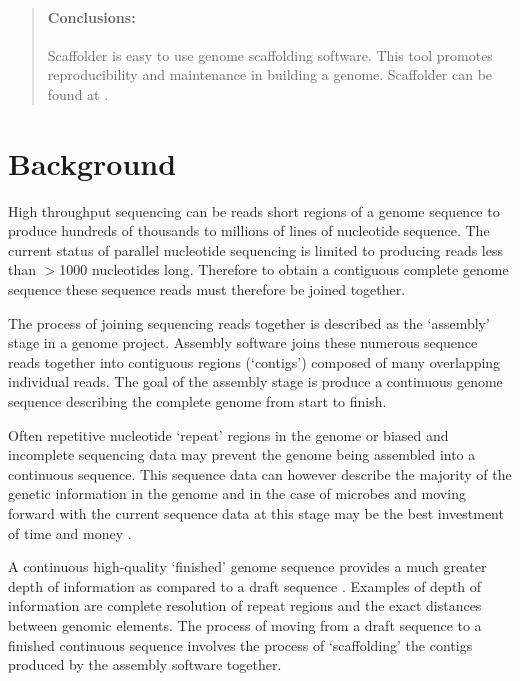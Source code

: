 \documentclass[10pt]{bmc_article}
\newenvironment{bmcformat}{\begin{raggedright}\baselineskip20pt\sloppy\setboolean{publ}{false}}{\end{raggedright}\baselineskip20pt\sloppy}
\begin{document}
\begin{bmcformat}
\begin{abstract}
  \paragraph*{Conclusions:} Scaffolder is easy to use genome scaffolding
  software. This tool promotes reproducibility and maintenance in building
  a genome. Scaffolder can be found at \scaffolder.

\end{abstract}


\section*{Background} %

High throughput sequencing can be reads short regions of a genome sequence to
produce hundreds of thousands to millions of lines of nucleotide sequence. The
current status of parallel nucleotide sequencing is limited to producing reads
less than $>$1000 nucleotides long. Therefore to obtain a contiguous complete
genome sequence these sequence reads must therefore be joined together. \pb

The process of joining sequencing reads together is described as the
`assembly' stage in a genome project. Assembly software joins these numerous
sequence reads together into contiguous regions (`contigs') composed of many
overlapping individual reads. The goal of the assembly stage is produce
a continuous genome sequence describing the complete genome from start to
finish. \pb

Often repetitive nucleotide `repeat' regions in the genome or biased and
incomplete sequencing data may prevent the genome being assembled into
a continuous sequence. This sequence data can however describe the majority of
the genetic information in the genome and in the case of microbes and moving
forward with the current sequence data at this stage may be the best
investment of time and money \cite{branscomb2002}. \pb

A continuous high-quality `finished' genome sequence provides a much greater
depth of information as compared to a draft sequence
\cite{parkhill2002,fraser2002}. Examples of depth of information are complete
resolution of repeat regions and the exact distances between genomic elements.
The process of moving from a draft sequence to a finished continuous sequence
involves the process of `scaffolding' the contigs produced by the assembly
software together. \pb


\end{bmcformat}
\end{document}
